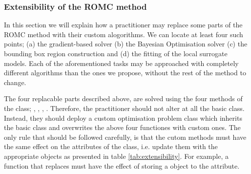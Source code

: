 \subsubsection{Extensibility of the ROMC method}

In this section we will explain how a practitioner may replace some
parts of the ROMC method with their custom alogorithms. We can locate
at least four such points; (a) the gradient-based solver (b) the
Bayesian Optimisation solver (c) the bounding box region construction
and (d) the fitting of the local surrogate models. Each of the
aforementioned tasks may be approached with completely different
algorithms than the ones we propose, without the rest of the method to
change.

The four replacable parts described above, are solved using the four
methods of the \linebreak {} class;
, , \linebreak
{},
. Therefore, the practitioner
should not alter at all the basic  class. Instead, they
should deploy a custom optimisation problem class which inherits the
basic  class and overwrites the above four
functiones with custom ones. The only rule that should be followed
carefully, is that the cutom methods must have the same effect on the
attributes of the  class, i.e. update them with the
appropriate objects as presented in table \ref{tab:extensibility}. For
example, a function that replaces  must
have the effect of storing a  object
to the  attribute.

